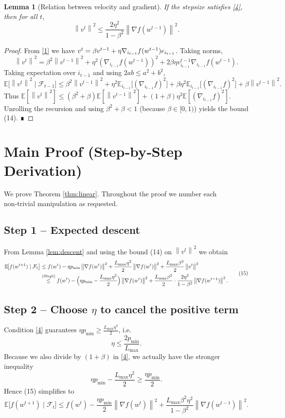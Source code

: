 \documentclass{article}
\newtheorem{lemma}{Lemma}
\newcommand{\E}{\mathbb{E}}
\newcommand{\norm}[1]{\left\|#1\right\|}
\newcommand{\grad}[1]{\nabla #1}
\begin{document}
\begin{lemma}[Relation between velocity and gradient]\label{lem:velocity}
If the stepsize satisfies \eqref{4}, then for all $t$,
\[
    \norm{v^{t}}^{2}\le \frac{2\eta^{2}}{1-\beta^{2}}\norm{\grad f(w^{t-1})}^{2}. \tag{14}
\]
\end{lemma}
\begin{proof}
From \eqref{1} we have $v^{t}= \beta v^{t-1}+ \eta \grad_{i_{t-1}} f(w^{t-1}) e_{i_{t-1}}$. Taking norms,
\[
\norm{v^{t}}^{2}
    =\beta^{2}\norm{v^{t-1}}^{2}+ \eta^{2}(\nabla_{i_{t-1}}f(w^{t-1}))^{2}
    +2\beta\eta v^{t-1}_{i_{t-1}}\nabla_{i_{t-1}}f(w^{t-1}) .
\]
Taking expectation over $i_{t-1}$ and using $2ab\le a^{2}+b^{2}$,
\[
\E\!\bigl[\norm{v^{t}}^{2}\mid\mathcal{F}_{t-1}\bigr]
    \le\beta^{2}\norm{v^{t-1}}^{2}+ \eta^{2}\E_{i_{t-1}}\!\bigl[(\nabla_{i_{t-1}}f)^{2}\bigr]
    +\beta\eta^{2}\E_{i_{t-1}}\!\bigl[(\nabla_{i_{t-1}}f)^{2}\bigr]
    +\beta\norm{v^{t-1}}^{2}.
\]
Thus $\E[\norm{v^{t}}^{2}]\le (\beta^{2}+\beta)\E[\norm{v^{t-1}}^{2}]+(1+\beta)\eta^{2}\E[(\nabla_{i_{t-1}}f)^{2}]$. Unrolling the recursion and using $\beta^{2}+\beta<1$ (because $\beta\in[0,1)$) yields the bound (14). ∎
\end{proof}

\section*{Main Proof (Step‑by‑Step Derivation)}
We prove Theorem \ref{thm:linear}. Throughout the proof we number each non‑trivial manipulation as requested.

\subsection*{Step 1 – Expected descent}
From Lemma \ref{lem:descent} and using the bound (14) on $\norm{v^{t}}^{2}$ we obtain
\[
\begin{aligned}
    \E\!\bigl[f(w^{t+1})\mid\mathcal{F}_{t}\bigr]
    &\le f(w^{t}) -\eta p_{\min}\norm{\grad f(w^{t})}^{2}
        +\frac{L_{\max}\eta^{2}}{2}\norm{\grad f(w^{t})}^{2}
        +\frac{L_{\max}\beta^{2}}{2}\norm{v^{t}}^{2} \\
    &\stackrel{[Step 1]}{\le}
        f(w^{t}) -\Bigl(\eta p_{\min}-\frac{L_{\max}\eta^{2}}{2}\Bigr)\norm{\grad f(w^{t})}^{2}
        +\frac{L_{\max}\beta^{2}}{2}\cdot\frac{2\eta^{2}}{1-\beta^{2}}\norm{\grad f(w^{t-1})}^{2} .
\end{aligned}
\tag{15}
\]

\subsection*{Step 2 – Choose $\eta$ to cancel the positive term}
Condition \eqref{4} guarantees $\eta p_{\min}\ge \frac{L_{\max}\eta^{2}}{2}$, i.e.
\[
\eta\le\frac{2p_{\min}}{L_{\max}} .
\]
Because we also divide by $(1+\beta)$ in \eqref{4}, we actually have the stronger inequality
\[
\eta p_{\min}-\frac{L_{\max}\eta^{2}}{2}\ge \frac{\eta p_{\min}}{2}. \tag{16}
\]
Hence (15) simplifies to
\[
\E\!\bigl[f(w^{t+1})\mid\mathcal{F}_{t}\bigr]
    \le f(w^{t}) -\frac{\eta p_{\min}}{2}\norm{\grad f(w^{t})}^{2}
        +\frac{L_{\max}\beta^{2}\eta^{2}}{1-\beta^{2}}\norm{\grad f(w^{t-1})}^{2}. \tag{17}
\]
\end{document}
